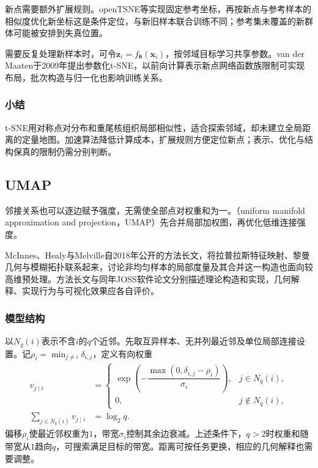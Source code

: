 新点需要额外扩展规则。openTSNE等实现固定参考坐标，再按新点与参考样本的相似度优化新坐标这是条件定位，与新旧样本联合训练不同；参考集未覆盖的新群体可能被安排到失真位置。

需要反复处理新样本时，可令$\bm{z}_i=f_{\bm{\theta}}(\bm{x}_i)$，按邻域目标学习共享参数。van der Maaten于2009年提出参数化t-SNE，以前向计算表示新点网络函数族限制可实现布局，批次构造与归一化也影响训练关系。

\subsubsection{小结}

t-SNE用对称点对分布和重尾核组织局部相似性，适合探索邻域，却未建立全局距离的定量地图。加速算法降低计算成本，扩展规则方便定位新点；表示、优化与结构保真的限制仍需分别判断。

\subsection{UMAP}
\label{sec:dim-umap}

邻接关系也可以逐边赋予强度，无需使全部点对权重和为一。（uniform manifold approximation and projection，UMAP）先合并局部加权图，再优化低维连接强度。

McInnes、Healy与Melville自2018年公开的方法长文，将拉普拉斯特征映射、黎曼几何与模糊拓扑联系起来，讨论非均匀样本的局部度量及其合并这一构造也面向较高维预处理。方法长文与同年JOSS软件论文分别描述理论构造和实现，几何解释、实现行为与可视化效果应各自评价。

\subsubsection{模型结构}

以$N_q(i)$表示不含$i$的$q$个近邻。先取互异样本、无并列最近邻及单位局部连接设置。记$\rho_i=\min_{j\ne i}\delta_{i,j}$，定义有向权重
\begin{equation}
  \label{eq:dim-umap-directed}
  \begin{aligned}
    v_{j\mid i}
      &=
      \begin{cases}
        \exp\!\left(-\dfrac{\max(0,\delta_{i,j}-\rho_i)}
        {\sigma_i}\right),&j\in N_q(i),\\
        0,&j\notin N_q(i),
      \end{cases}\\
    \sum_{j\in N_q(i)}v_{j\mid i}&=\log_2 q.
  \end{aligned}
\end{equation}
偏移$\rho_i$使最近邻权重为$1$，带宽$\sigma_i$控制其余边衰减。上述条件下，$q>2$时权重和随带宽从$1$趋向$q$，可搜索满足目标的带宽。距离可按任务更换，相应的几何解释也需要调整。

